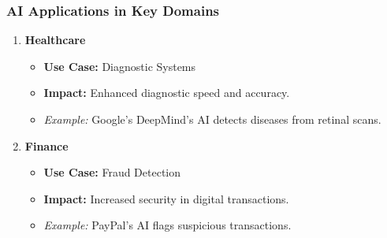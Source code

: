 \documentclass[aspectratio=169]{beamer}
\begin{document}
\begin{frame}[fragile]
    \frametitle{AI Applications in Key Domains}
    \begin{enumerate}
        \item \textbf{Healthcare}
            \begin{itemize}
                \item \textbf{Use Case:} Diagnostic Systems
                \item \textbf{Impact:} Enhanced diagnostic speed and accuracy.
                \item \textit{Example:} Google's DeepMind's AI detects diseases from retinal scans.
            \end{itemize}
        
        \item \textbf{Finance}
            \begin{itemize}
                \item \textbf{Use Case:} Fraud Detection
                \item \textbf{Impact:} Increased security in digital transactions.
                \item \textit{Example:} PayPal's AI flags suspicious transactions.
            \end{itemize}
    \end{enumerate}
\end{frame}
\end{document}
